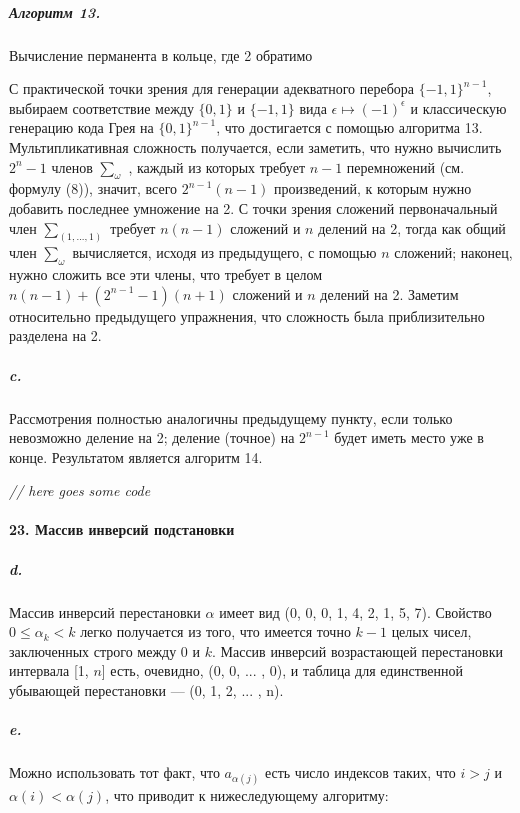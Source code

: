 \documentclass{../../template/mai_book}
\begin{document}
\subparagraph{Алгоритм 13.} Вычисление перманента в кольце, где 2 обратимо \newline

С практической точки зрения для генерации адекватного перебора \linebreak $\{-1, 1\}^{n - 1}$, выбираем соответствие между $\{0, 1\}$ и $\{-1, 1\}$ вида $\epsilon \mapsto (-1)^\epsilon$ и классическую генерацию кода Грея на $\{0, 1\}^{n - 1}$, что достигается с помощью алгоритма 13. Мультипликативная сложность получается, если заметить, что нужно вычислить $2^n - 1$ членов ${\sum}_\omega$ , каждый из которых требует $n - 1$ перемножений (см. формулу (8)), значит, всего $2^{n - 1}(n - 1)$ произведений, к которым нужно добавить последнее умножение на 2. С точки зрения сложений первоначальный член ${\sum}_{(1,...,1)}$ требует $n(n - 1)$ сложений и $n$ делений на 2, тогда как общий член ${\sum}_\omega$ вычисляется, исходя из предыдущего, с помощью $n$ сложений; наконец, нужно сложить все эти члены, что требует в целом $n(n - 1) + (2^{n - 1} - 1)(n + 1)$ сложений и $n$ делений на 2. Заметим относительно предыдущего упражнения, что сложность была приблизительно разделена на 2.

\newpage


\subparagraph{c.} Рассмотрения полностью аналогичны предыдущему пункту, если
только невозможно деление на 2; деление (точное) на $2^{n - 1}$ будет иметь
место уже в конце. Результатом является алгоритм 14. \newline

\textit{// here goes some code}

\paragraph{23. Массив инверсий подстановки}

\subparagraph{d.} Массив инверсий перестановки $\alpha$ имеет вид (0, 0, 0, 1, 4, 2, 1, 5, 7). Свойство $0 \leqslant \alpha_k < k$ легко получается из того, что имеется точно $k - 1$ целых чисел, заключенных строго между 0 и $k$. Массив инверсий возрастающей перестановки интервала [1, $n$] есть, очевидно, (0, 0, ... , 0), и таблица для единственной убывающей перестановки —  (0, 1, 2, ... , n).

\subparagraph{e.} Можно использовать тот факт, что $a_{\alpha(j)}$ есть число индексов таких, что $i > j$ и $\alpha(i) < \alpha(j)$, что приводит к нижеследующему алгоритму: \newline
\end{document}
